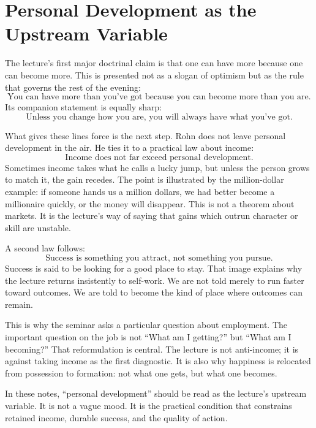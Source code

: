 \section{Personal Development as the Upstream Variable}

The lecture's first major doctrinal claim is that one can have more because one can become more. This is presented not as a slogan of optimism but as the rule that governs the rest of the evening:
\begin{equation}
\text{You can have more than you've got because you can become more than you are.}
\end{equation}
Its companion statement is equally sharp:
\begin{equation}
\text{Unless you change how you are, you will always have what you've got.}
\end{equation}

What gives these lines force is the next step. Rohn does not leave personal development in the air. He ties it to a practical law about income:
\begin{equation}
\text{Income does not far exceed personal development.}
\end{equation}
Sometimes income takes what he calls a lucky jump, but unless the person grows to match it, the gain recedes. The point is illustrated by the million-dollar example: if someone hands us a million dollars, we had better become a millionaire quickly, or the money will disappear. This is not a theorem about markets. It is the lecture's way of saying that gains which outrun character or skill are unstable.

A second law follows:
\begin{equation}
\text{Success is something you attract, not something you pursue.}
\end{equation}
Success is said to be looking for a good place to stay. That image explains why the lecture returns insistently to self-work. We are not told merely to run faster toward outcomes. We are told to become the kind of place where outcomes can remain.

This is why the seminar asks a particular question about employment. The important question on the job is not ``What am I getting?'' but ``What am I becoming?'' That reformulation is central. The lecture is not anti-income; it is against taking income as the first diagnostic. It is also why happiness is relocated from possession to formation: not what one gets, but what one becomes.

\begin{remark}
In these notes, ``personal development'' should be read as the lecture's upstream variable. It is not a vague mood. It is the practical condition that constrains retained income, durable success, and the quality of action.
\end{remark}

